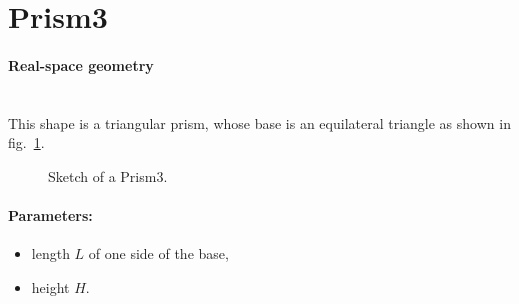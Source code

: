 \newpage
\section{Prism3} 

\paragraph{Real-space geometry}\mbox{}\\
This shape is a triangular prism, whose base is an equilateral
triangle as shown in fig.~\ref{fig:prism3}.

\begin{figure}[ht]
\hfill
{}
\hfill
{}
\hfill
\caption{Sketch of a Prism3.}
\label{fig:prism3}
\end{figure}

\FloatBarrier

\paragraph{Parameters:}
\begin{itemize}
\item length $L$ of one side of the base, 
\item height $H$.
\end{itemize}

